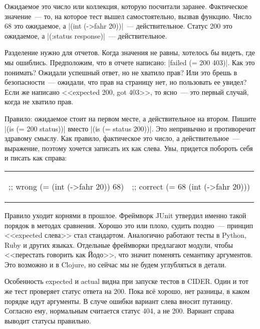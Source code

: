 Ожидаемое это число или коллекция, которую посчитали заранее. Фактическое значение~---
то, на которое тест вышел самостоятельно, вызвав функцию. Число 68 это ожидаемое,
а \spverb|(int (->fahr 20))|~--- действительное. Статус 200 это ожидаемое,
а \spverb|(:status response)|~--- действительное.

Разделение нужно для отчетов. Когда значения не равны, хотелось бы видеть, где
мы ошиблись. Предположим, что в отчете написано: \spverb|failed (= 200 403)|.
Как это понимать? Ожидали успешный ответ, но не хватило прав? Или это брешь в
безопасности~--- ожидали, что прав на страницу нет, но пользовать ее увидел?
Если же написано <<expected 200, got 403>>, то ясно~--- это первый случай,
когда не хватило прав.

Правило: ожидаемое стоит на первом месте, а действительное на втором. Пишите
\spverb|(is (= 200 status))| вместо \spverb|(is (= status 200))|. Это непривычно
и противоречит здравому смыслу. Как правило, фактическое это число, а
действительное~--- выражение, поэтому хочется записать их как слева. Увы,
придется побороть себя и писать как справа:

\noindent
\begin{tabular}{ @{}p{5cm} @{}p{5cm} }

\begin{english}
  \begin{clojure}
;; wrong
(= (int (->fahr 20)) 68)
  \end{clojure}
\end{english}

&

\begin{english}
  \begin{clojure}
;; correct
(= 68 (int (->fahr 20)))
  \end{clojure}
\end{english}

\end{tabular}

Правило уходит корнями в прошлое. Фреймворк JUnit утвердил именно такой порядок
в методах сравнения.
Хорошо это или плохо, судить поздно~--- принцип <<expected слева>> стал
стандартом. Аналогично работают тесты в Python, Ruby и других языках. Отдельные
фреймворки предлагают модули, чтобы <<перестать говорить как Йодо>>, что значит
поменять семантику аргументов. Это возможно и в Clojure, но сейчас мы не будем
углубляться в детали.

Особенность expected и actual видна при запуске тестов в CIDER. Один и тот же
тест проверяет статус ответа на 200. Пока вс\"{е} хорошо, нет разницы, в каком
порядке идут аргументы. В случе ошибки вариант слева вносит путаницу. Согласно
ему, нормальным считается статус 404, а не 200. Вариант справа выводит статусы
правильно.

